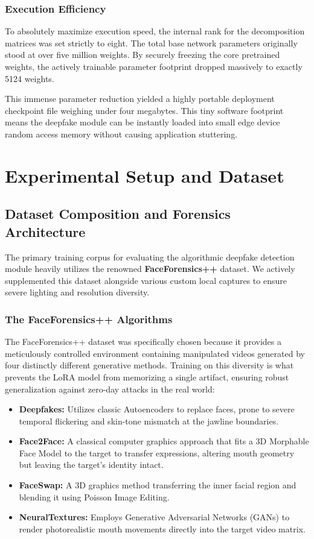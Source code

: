 \documentclass[12pt,a4paper]{report}
\begin{document}
\subsection{Execution Efficiency}
To absolutely maximize execution speed, the internal rank for the decomposition matrices was set strictly to eight. The total base network parameters originally stood at over five million weights. By securely freezing the core pretrained weights, the actively trainable parameter footprint dropped massively to exactly 5124 weights. 

This immense parameter reduction yielded a highly portable deployment checkpoint file weighing under four megabytes. This tiny software footprint means the deepfake module can be instantly loaded into small edge device random access memory without causing application stuttering.

\chapter{Experimental Setup and Dataset}
\section{Dataset Composition and Forensics Architecture}
The primary training corpus for evaluating the algorithmic deepfake detection module heavily utilizes the renowned \textbf{FaceForensics++} dataset. We actively supplemented this dataset alongside various custom local captures to ensure severe lighting and resolution diversity. 

\subsection{The FaceForensics++ Algorithms}
The FaceForensics++ dataset was specifically chosen because it provides a meticulously controlled environment containing manipulated videos generated by four distinctly different generative methods. Training on this diversity is what prevents the LoRA model from memorizing a single artifact, ensuring robust generalization against zero-day attacks in the real world:
\begin{itemize}
    \item \textbf{Deepfakes:} Utilizes classic Autoencoders to replace faces, prone to severe temporal flickering and skin-tone mismatch at the jawline boundaries.
    \item \textbf{Face2Face:} A classical computer graphics approach that fits a 3D Morphable Face Model to the target to transfer expressions, altering mouth geometry but leaving the target's identity intact.
    \item \textbf{FaceSwap:} A 3D graphics method transferring the inner facial region and blending it using Poisson Image Editing.
    \item \textbf{NeuralTextures:} Employs Generative Adversarial Networks (GANs) to render photorealistic mouth movements directly into the target video matrix.
\end{itemize}
\end{document}
